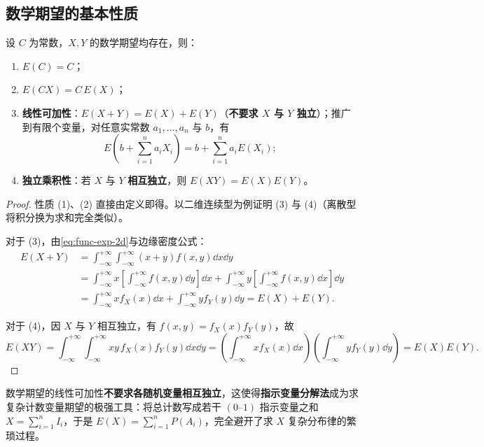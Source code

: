 \subsection{数学期望的基本性质}

\begin{proposition}[数学期望的基本性质]
\label{prop:expectation-properties}
设 $C$ 为常数，$X,Y$ 的数学期望均存在，则：
\begin{enumerate}
  \item $E(C)=C$；
  \item $E(CX)=C\,E(X)$；
  \item \textbf{线性可加性}：$E(X+Y)=E(X)+E(Y)$（\textbf{不要求 $X$ 与 $Y$ 独立}）；推广到有限个变量，对任意实常数 $a_1,\ldots,a_n$ 与 $b$，有
  \[
    E\!\left(b+\sum_{i=1}^{n}a_i X_i\right)=b+\sum_{i=1}^{n}a_i E(X_i);
  \]
  \item \textbf{独立乘积性}：若 $X$ 与 $Y$ \textbf{相互独立}，则 $E(XY)=E(X)E(Y)$。
\end{enumerate}
\end{proposition}
\begin{proof}
性质 (1)、(2) 直接由定义即得。以二维连续型为例证明 (3) 与 (4)（离散型将积分换为求和完全类似）。

对于 (3)，由\eqref{eq:func-exp-2d}与边缘密度公式：
\[
\begin{aligned}
  E(X+Y)&=\int_{-\infty}^{+\infty}\int_{-\infty}^{+\infty}(x+y)f(x,y)\dd x\dd y\\
  &=\int_{-\infty}^{+\infty}x\left[\int_{-\infty}^{+\infty}f(x,y)\dd y\right]\dd x
   +\int_{-\infty}^{+\infty}y\left[\int_{-\infty}^{+\infty}f(x,y)\dd x\right]\dd y\\
  &=\int_{-\infty}^{+\infty}x f_X(x)\dd x+\int_{-\infty}^{+\infty}y f_Y(y)\dd y=E(X)+E(Y).
\end{aligned}
\]

对于 (4)，因 $X$ 与 $Y$ 相互独立，有 $f(x,y)=f_X(x)f_Y(y)$，故
\[
  E(XY)=\int_{-\infty}^{+\infty}\int_{-\infty}^{+\infty}xy\,f_X(x)f_Y(y)\dd x\dd y
  =\left(\int_{-\infty}^{+\infty}x f_X(x)\dd x\right)\left(\int_{-\infty}^{+\infty}y f_Y(y)\dd y\right)
  =E(X)E(Y).
\]
\end{proof}

数学期望的线性可加性\textbf{不要求各随机变量相互独立}，这使得\textbf{指示变量分解法}成为求复杂计数变量期望的极强工具：将总计数写成若干 $(0\text{--}1)$ 指示变量之和 $X=\sum_{i=1}^{n}I_i$，于是 $E(X)=\sum_{i=1}^{n}P(A_i)$，完全避开了求 $X$ 复杂分布律的繁琐过程。


